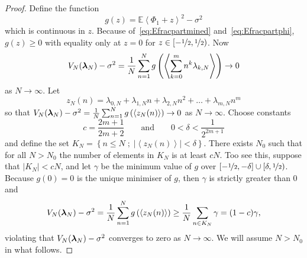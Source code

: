 \documentclass[aap]{imsart}
\newcommand{\expect}{{\mathbb E}}
\renewcommand{\mid}{\; ; \;}
\newcommand{\fracpart}[1]{\left\langle #1 \right\rangle}
\newcommand{\sabs}[1]{\vert #1 \vert}
\begin{document}
\begin{proof}
Define the function
\begin{equation}\label{eq:gz}
g(z) = \expect\fracpart{\Phi_1 + z}^2 - \sigma^2
\end{equation}
which is continuous in $z$. Because of~\eqref{eq:Efracpartmined} and~\eqref{eq:Efracpartphi}, $g(z) \geq 0$ with equality only at $z = 0$ for $z \in [-\nicefrac{1}{2}, \nicefrac{1}{2})$. Now
\[
V_N(\lambdabf_N) - \sigma^2 = \frac{1}{N}\sum_{n=1}^{N} g\left( \fracpart{ \sum_{k=0}^{m}{n^k \lambda_{k,N}} } \right) \rightarrow 0
\]
as $N \rightarrow \infty$. Let
\[
z_N(n) = \lambda_{0,N} + \lambda_{1,N} n + \lambda_{2,N} n^2 + \dots + \lambda_{m,N} n^m
\]
so that $V_N(\lambdabf_N) - \sigma^2 = \frac{1}{N}\sum_{n=1}^{N} g\left( \fracpart{z_N(n)} \right) \rightarrow 0$ as $N \rightarrow \infty$.
Choose constants 
\[
c = \frac{2m+1}{2m+2} \qquad \text{and} \qquad 0 < \delta < \frac{1}{2^{2m+1}}
\]
and define the set $K_{N}=\left\{  n\leq N \mid \sabs{\fracpart{z_N(n)}} < \delta \right\}$.  There exists $N_0$ such that for all $N > N_0$ the number of elements in $K_N$ is at least $cN$.  Too see this, suppose that $\sabs{K_N} < cN$, and let $\gamma$ be the minimum value of $g$ over $[-\nicefrac{1}{2},-\delta] \cup [\delta, \nicefrac{1}{2})$. Because $g(0) = 0$ is the unique minimiser of $g$, then $\gamma$ is strictly greater than $0$ and
\begin{align*}
V_N(\lambdabf_N) - \sigma^2 = \frac{1}{N}\sum_{n=1}^{N} g\left( \fracpart{z_N(n)} \right) \geq \frac{1}{N}\sum_{n\in K_N} \gamma = (1-c)\gamma,
\end{align*}
violating that $V_N(\boldsymbol{\lambda}_N) - \sigma^2$ converges to zero as $N \rightarrow \infty$.  We will assume $N > N_0$ in what follows.


\end{proof}
\end{document}
